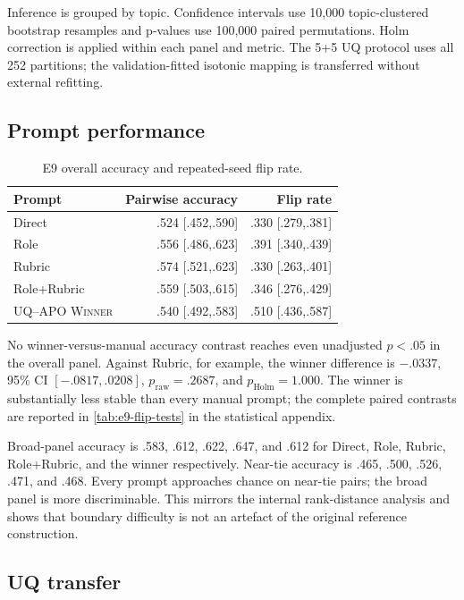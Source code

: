 \documentclass[11pt,twoside,a4paper]{report}
\newcommand{\winner}{\textsc{UQ--APO Winner}}
\newcommand{\rawp}{\ensuremath{p_{\mathrm{raw}}}}
\newcommand{\holmp}{\ensuremath{p_{\mathrm{Holm}}}}
\begin{document}
Inference is grouped by topic.  Confidence intervals use 10,000 topic-clustered
bootstrap resamples and p-values use 100,000 paired permutations.  Holm correction
is applied within each panel and metric.  The 5+5 UQ protocol uses all 252 partitions;
the validation-fitted isotonic mapping is transferred without external refitting.

\subsection{Prompt performance}

\begin{table}[htbp]
\centering
\caption{E9 overall accuracy and repeated-seed flip rate.}
\label{tab:e9-prompts}
\begin{tabular}{lrr}
\toprule
Prompt & Pairwise accuracy & Flip rate \\
\midrule
Direct & .524 [.452,.590] & .330 [.279,.381] \\
Role & .556 [.486,.623] & .391 [.340,.439] \\
Rubric & .574 [.521,.623] & .330 [.263,.401] \\
Role+Rubric & .559 [.503,.615] & .346 [.276,.429] \\
\winner & .540 [.492,.583] & .510 [.436,.587] \\
\bottomrule
\end{tabular}
\end{table}

No winner-versus-manual accuracy contrast reaches even unadjusted $p<.05$ in the
overall panel.  Against Rubric, for example, the winner difference is $-.0337$,
95\% CI $[-.0817,.0208]$, $\rawp=.2687$, and $\holmp=1.000$.
The winner is substantially less stable than every manual prompt; the complete
paired contrasts are reported in \cref{tab:e9-flip-tests} in the statistical
appendix.

Broad-panel accuracy is .583, .612, .622, .647, and .612 for Direct, Role, Rubric,
Role+Rubric, and the winner respectively.  Near-tie accuracy is .465, .500, .526,
.471, and .468.  Every prompt approaches chance on near-tie pairs; the broad panel is
more discriminable.  This mirrors the internal rank-distance analysis and shows that
boundary difficulty is not an artefact of the original reference construction.

\subsection{UQ transfer}
\end{document}
